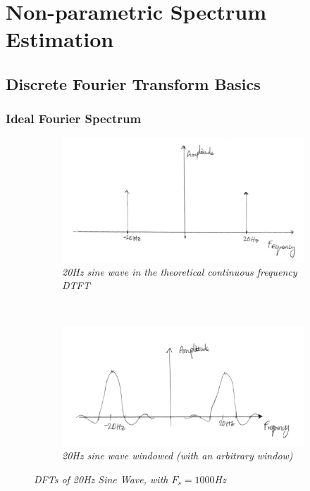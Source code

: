 \documentclass[./main.tex]{subfiles}
\begin{document}
\section{Non-parametric Spectrum Estimation}

\subsection{Discrete Fourier Transform Basics}

\subsubsection{Ideal Fourier Spectrum} \label{sec:1_1_a}

\begin{figure}[h]
	\centering
	\begin{subfigure}[b]{0.49\textwidth}
		\includegraphics[scale=0.5]{fig/1/1_1_a_coherent.jpg}
		\caption{\textit{20Hz sine wave in the theoretical continuous frequency DTFT}}
	\end{subfigure}
	~ %
	\begin{subfigure}[b]{0.49\textwidth}
		\includegraphics[scale=0.14]{fig/1/1_1_a_sinc.jpg}
		\caption{\textit{20Hz sine wave windowed (with an arbitrary window)}}
	\end{subfigure}
	\label{fig:1_1_1}
	\caption{\textit{DFTs of 20Hz Sine Wave, with $ F_s = 1000 $Hz}}
\end{figure}
\end{document}
